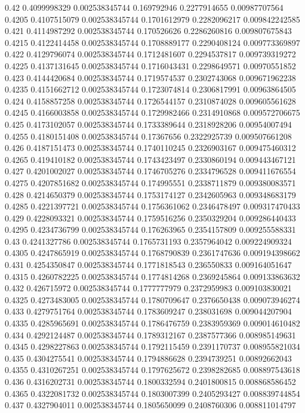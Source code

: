 {0.42 0.4099998329 0.002538345744 0.169792946 0.2277914655 0.00987707564
0.4205 0.4107515079 0.002538345744 0.1701612979 0.2282096217 0.009842242585
0.421 0.4114987292 0.002538345744 0.170526626 0.2286260816 0.009807675843
0.4215 0.4122414458 0.002538345744 0.1708889177 0.2290408124 0.009773369897
0.422 0.4129796074 0.002538345744 0.1712481607 0.2294537817 0.009739319272
0.4225 0.4137131645 0.002538345744 0.1716043431 0.2298649571 0.00970551852
0.423 0.4144420684 0.002538345744 0.1719574537 0.2302743068 0.009671962238
0.4235 0.4151662712 0.002538345744 0.1723074814 0.2306817991 0.00963864505
0.424 0.4158857258 0.002538345744 0.1726544157 0.2310874028 0.009605561628
0.4245 0.4166003858 0.002538345744 0.1729982466 0.2314910868 0.009572706675
0.425 0.4173102057 0.002538345744 0.1733389644 0.2318928206 0.00954007494
0.4255 0.4180151408 0.002538345744 0.17367656 0.2322925739 0.009507661208
0.426 0.4187151473 0.002538345744 0.1740110245 0.2326903167 0.009475460312
0.4265 0.419410182 0.002538345744 0.1743423497 0.2330860194 0.009443467121
0.427 0.4201002027 0.002538345744 0.1746705276 0.2334796528 0.009411676554
0.4275 0.4207851682 0.002538345744 0.174995551 0.2338711879 0.009380083571
0.428 0.4214650379 0.002538345744 0.1753174127 0.2342605963 0.009348683179
0.4285 0.4221397721 0.002538345744 0.1756361062 0.2346478497 0.009317470433
0.429 0.4228093321 0.002538345744 0.1759516256 0.2350329204 0.009286440433
0.4295 0.4234736799 0.002538345744 0.176263965 0.2354157809 0.009255588331
0.43 0.4241327786 0.002538345744 0.1765731193 0.2357964042 0.009224909324
0.4305 0.4247865919 0.002538345744 0.1768790839 0.2361747636 0.009194398662
0.431 0.4254350847 0.002538345744 0.1771818543 0.236550833 0.009164051647
0.4315 0.4260782225 0.002538345744 0.1774814268 0.2369245864 0.009133863632
0.432 0.426715972 0.002538345744 0.1777777979 0.2372959983 0.009103830021
0.4325 0.4273483005 0.002538345744 0.1780709647 0.2376650438 0.009073946274
0.433 0.4279751764 0.002538345744 0.1783609247 0.238031698 0.009044207904
0.4335 0.4285965691 0.002538345744 0.1786476759 0.2383959369 0.009014610482
0.434 0.4292124487 0.002538345744 0.1789312167 0.2387577366 0.008985149631
0.4345 0.4298227863 0.002538345744 0.1792115459 0.2391170737 0.008955821034
0.435 0.4304275541 0.002538345744 0.1794886628 0.2394739251 0.00892662043
0.4355 0.4310267251 0.002538345744 0.1797625672 0.2398282685 0.008897543618
0.436 0.4316202731 0.002538345744 0.1800332594 0.2401800815 0.008868586452
0.4365 0.4322081732 0.002538345744 0.1803007399 0.2405293427 0.008839744854
0.437 0.4327904011 0.002538345744 0.1805650099 0.2408760306 0.008811014797
}
